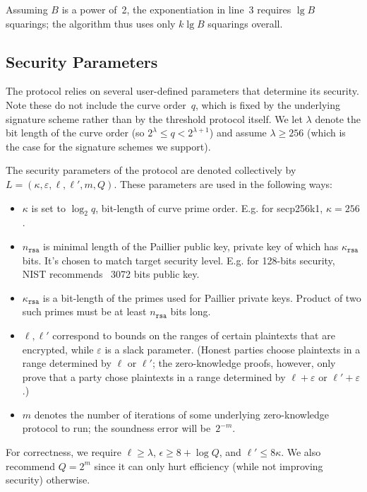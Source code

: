 \documentclass[11pt]{article}
\def\eps{\varepsilon}
\newcommand{\rsa}{\ensuremath{\mathtt{rsa}}}
\newcommand{\?}[1]{\stackrel{?}{#1}}
\begin{document}
\noindent
Assuming $B$ is a power of~2, the exponentiation in line~3 requires $\lg B$ squarings; the algorithm thus uses only $k\lg B$ squarings overall.

\subsection{Security Parameters}
\label{sec:security-params}

The protocol relies on several user-defined parameters that determine its security. Note  these do not include the curve order~$q$, which is fixed by the underlying signature scheme  rather than by the threshold protocol itself.
We let $\lambda$ denote the bit length of the curve order (so $2^\lambda \leq q < 2^{\lambda+1}$) and assume $\lambda\geq 256$ (which is the case for the signature schemes we support).

The security parameters of the protocol are denoted collectively by $L = (\kappa, \varepsilon, \ell, \ell', m, Q)$. 
These parameters are used in the following ways:
\begin{itemize}
    \item $\kappa$ is set to $\log_2 q$, bit-length of curve prime order. E.g. for secp256k1, $\kappa = 256$.

    \item $n_\rsa$ is minimal length of the Paillier public key, private key of which has $\kappa_\rsa$ bits. It's chosen to match target security level. E.g. for 128-bits security, NIST recommends~\cite{NIST-RSA-keylen} 3072 bits public key.
    \item $\kappa_\rsa$ is a bit-length of the primes used for Paillier private keys. Product of two such primes must be at least $n_\rsa$ bits long.

    \item $\ell, \ell'$ correspond to bounds on the ranges of certain plaintexts that are encrypted, while %
    $\eps$ is a slack parameter. (Honest parties choose plaintexts in a range determined by $\ell$ or $\ell'$; the zero-knowledge proofs, however, only prove that a party chose plaintexts in a range determined by $\ell+\eps$ or $\ell'+\eps$.)

    \item $m$ denotes the number of iterations of some underlying zero-knowledge protocol to run; the soundness error will be~$2^{-m}$.
\end{itemize}
For correctness, we require
$\ell \geq \lambda$,
    $\epsilon \geq 8 + \log Q$, and
    $\ell' \leq 8\kappa$.
We also recommend $Q=2^m$ since it can only hurt efficiency (while not improving security) otherwise. %
\end{document}
